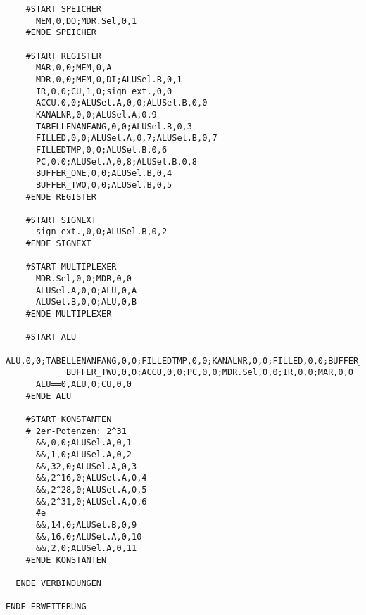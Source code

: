 {\begin{verbatim}
    #START SPEICHER  
      MEM,0,DO;MDR.Sel,0,1
    #ENDE SPEICHER 
    
    #START REGISTER
      MAR,0,0;MEM,0,A
      MDR,0,0;MEM,0,DI;ALUSel.B,0,1
      IR,0,0;CU,1,0;sign ext.,0,0
      ACCU,0,0;ALUSel.A,0,0;ALUSel.B,0,0
      KANALNR,0,0;ALUSel.A,0,9
      TABELLENANFANG,0,0;ALUSel.B,0,3
      FILLED,0,0;ALUSel.A,0,7;ALUSel.B,0,7
      FILLEDTMP,0,0;ALUSel.B,0,6
      PC,0,0;ALUSel.A,0,8;ALUSel.B,0,8
      BUFFER_ONE,0,0;ALUSel.B,0,4
      BUFFER_TWO,0,0;ALUSel.B,0,5
    #ENDE REGISTER
    
    #START SIGNEXT
      sign ext.,0,0;ALUSel.B,0,2
    #ENDE SIGNEXT
    
    #START MULTIPLEXER
      MDR.Sel,0,0;MDR,0,0
      ALUSel.A,0,0;ALU,0,A
      ALUSel.B,0,0;ALU,0,B
    #ENDE MULTIPLEXER
        
    #START ALU
      ALU,0,0;TABELLENANFANG,0,0;FILLEDTMP,0,0;KANALNR,0,0;FILLED,0,0;BUFFER_ONE,0,0;
            BUFFER_TWO,0,0;ACCU,0,0;PC,0,0;MDR.Sel,0,0;IR,0,0;MAR,0,0
      ALU==0,ALU,0;CU,0,0
    #ENDE ALU

    #START KONSTANTEN
    # 2er-Potenzen: 2^31
      &&,0,0;ALUSel.A,0,1
      &&,1,0;ALUSel.A,0,2
      &&,32,0;ALUSel.A,0,3
      &&,2^16,0;ALUSel.A,0,4
      &&,2^28,0;ALUSel.A,0,5
      &&,2^31,0;ALUSel.A,0,6
      #e
      &&,14,0;ALUSel.B,0,9
      &&,16,0;ALUSel.A,0,10
      &&,2,0;ALUSel.A,0,11
    #ENDE KONSTANTEN
  
  ENDE VERBINDUNGEN
  
ENDE ERWEITERUNG
\end{verbatim}}